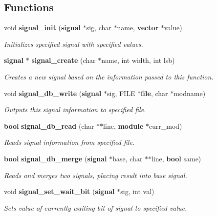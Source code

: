 \subsection*{Functions}
\begin{CompactItemize}
\item 
void {\bf signal\_\-init} ({\bf signal} $\ast$sig, char $\ast$name, {\bf vector} $\ast$value)
\begin{CompactList}\small\item\em Initializes specified signal with specified values. \item\end{CompactList}\item 
{\bf signal} $\ast$ {\bf signal\_\-create} (char $\ast$name, int width, int lsb)
\begin{CompactList}\small\item\em Creates a new signal based on the information passed to this function. \item\end{CompactList}\item 
void {\bf signal\_\-db\_\-write} ({\bf signal} $\ast$sig, FILE $\ast${\bf file}, char $\ast$modname)
\begin{CompactList}\small\item\em Outputs this signal information to specified file. \item\end{CompactList}\item 
{\bf bool} {\bf signal\_\-db\_\-read} (char $\ast$$\ast$line, {\bf module} $\ast$curr\_\-mod)
\begin{CompactList}\small\item\em Reads signal information from specified file. \item\end{CompactList}\item 
{\bf bool} {\bf signal\_\-db\_\-merge} ({\bf signal} $\ast$base, char $\ast$$\ast$line, {\bf bool} same)
\begin{CompactList}\small\item\em Reads and merges two signals, placing result into base signal. \item\end{CompactList}\item 
void {\bf signal\_\-set\_\-wait\_\-bit} ({\bf signal} $\ast$sig, int val)
\begin{CompactList}\small\item\em Sets value of currently waiting bit of signal to specified value. \item\end{CompactList}\item 

\end{CompactItemize}
